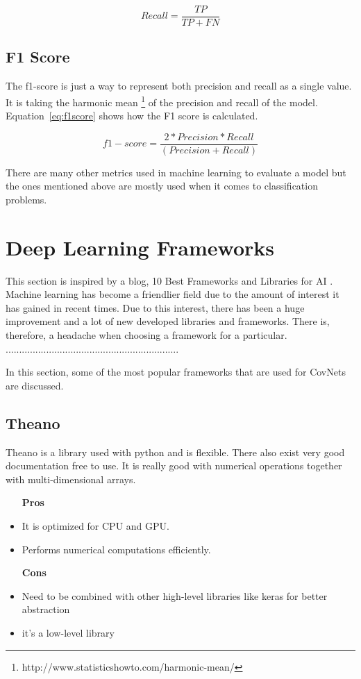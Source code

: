 \documentclass[12pt, a4paper,oneside]{report}
\begin{document}
\begin{equation}
Recall = \frac{TP}{TP + FN} \label{eq:recall}
\end{equation}

\subsection{F1 Score}
The f1-score is just a way to represent both precision and recall as a single value. It is taking the harmonic mean \footnote{http://www.statisticshowto.com/harmonic-mean/} of the precision and recall of the model. Equation~\ref{eq:f1score} shows how the F1 score is calculated.

\begin{equation}
f1-score = \frac{2 * Precision * Recall}{(Precision + Recall)} \label{eq:f1score}
\end{equation}

There are many other metrics used in machine learning to evaluate a model but the ones mentioned above are mostly used when it comes to classification problems.


\section{Deep Learning Frameworks}
This section is inspired by a blog, 10 Best Frameworks and Libraries for AI \cite{framework}. Machine learning has become a friendlier field due to the amount of interest it has gained in recent times. Due to this interest, there has been a huge improvement and a lot of new developed libraries and frameworks. There is, therefore, a headache when choosing a framework for a particular. 
................................................................

In this section, some of the most popular frameworks that are used for CovNets are discussed. 

\subsection{Theano}
Theano is a library used with python and is flexible. There also exist very good documentation free to use. It is really good with numerical operations together with multi-dimensional arrays.

\begin{itemize}
	\item [\textbf{Pros}]
	\item It is optimized for CPU and GPU.
	\item Performs numerical computations efficiently.
		
	\item [\textbf{Cons}]
	\item Need to be combined with other high-level libraries like keras for better abstraction
	\item it's a low-level library 
\end{itemize}
\end{document}
